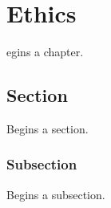 \let\textcircled=\pgftextcircled
\chapter{Ethics}
\label{chap:ethics}

egins a chapter. 

\section{Section}
\label{sec:sec01}

Begins a section.

\subsection{Subsection}
\label{subsec:subsec01}

Begins a subsection.
